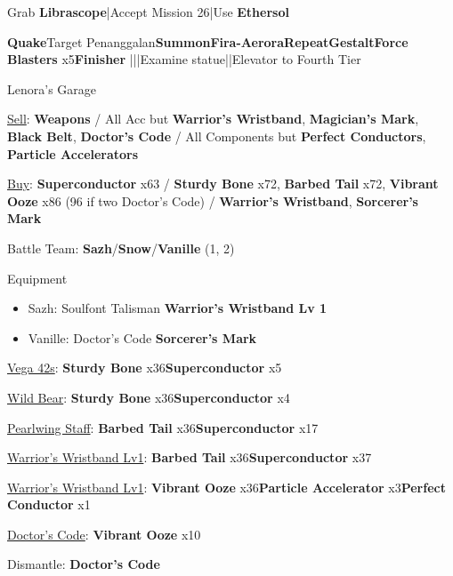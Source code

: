 \begin{mainlist}
	\item Grab \textbf{Librascope}|Accept Mission 26|Use \textbf{Ethersol}
	\item {} \textbf{Quake}\to Target Penanggalan\to \textbf{Summon}\to \textbf{Fira-Aerora}\to [6] \textbf{Repeat}\to \textbf{Gestalt}\to \textbf{Force Blasters} x5\to \textbf{Finisher} |\skip|\skip|Examine statue|\skip|Elevator to Fourth Tier
\end{mainlist}
\begin{shop}{Lenora's Garage}
	\item \underline{Sell}: \textbf{Weapons} / All Acc but \textbf{Warrior's Wristband}, \textbf{Magician's Mark}, \textbf{Black Belt}, \textbf{Doctor's Code} / All Components but \textbf{Perfect Conductors}, \textbf{Particle Accelerators}
	\item \underline{Buy}: \textbf{Superconductor} x63 / \textbf{Sturdy Bone} x72, \textbf{Barbed Tail} x72, \textbf{Vibrant Ooze} x86 (96 if two Doctor's Code) / \textbf{Warrior's Wristband}, \textbf{Sorcerer's Mark}
\end{shop}
\begin{menu}
	\item Battle Team: \textbf{Sazh}/\textbf{Snow}/\textbf{Vanille} (1, 2)
	\item Equipment
	\begin{itemize}
		\item Sazh: Soulfont Talisman \to \textbf{Warrior's Wristband Lv 1}
		\item Vanille: Doctor's Code \to \textbf{Sorcerer's Mark}
	\end{itemize}
\end{menu}
\begin{upgrade}
	\item \underline{Vega 42s}: \textbf{Sturdy Bone} x36\to \textbf{Superconductor} x5
	\item \underline{Wild Bear}: \textbf{Sturdy Bone} x36\to \textbf{Superconductor} x4
	\item \underline{Pearlwing Staff}: \textbf{Barbed Tail} x36\to \textbf{Superconductor} x17
	\item \underline{Warrior's Wristband Lv1}: \textbf{Barbed Tail} x36\to \textbf{Superconductor} x37
	\item \underline{Warrior's Wristband Lv1}: \textbf{Vibrant Ooze} x36\to \textbf{Particle Accelerator} x3\to \textbf{Perfect Conductor} x1
	\item \underline{Doctor's Code}: \textbf{Vibrant Ooze} x10
	\item Dismantle: \textbf{Doctor's Code}
\end{upgrade}
